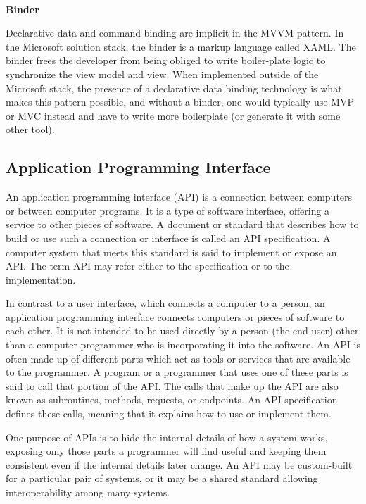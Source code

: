 \documentclass[12pt]{article}
\begin{document}
\\
\textbf{Binder}
\par
Declarative data and command-binding are implicit in the MVVM pattern. In the Microsoft solution stack, the binder is a markup language called XAML. The binder frees the developer from being obliged to write boiler-plate logic to synchronize the view model and view. When implemented outside of the Microsoft stack, the presence of a declarative data binding technology is what makes this pattern possible, and without a binder, one would typically use MVP or MVC instead and have to write more boilerplate (or generate it with some other tool).

\subsection{Application Programming Interface}


An application programming interface (API) is a connection between computers or between computer programs. It is a type of software interface, offering a service to other pieces of software. A document or standard that describes how to build or use such a connection or interface is called an API specification. A computer system that meets this standard is said to implement or expose an API. The term API may refer either to the specification or to the implementation.\par
In contrast to a user interface, which connects a computer to a person, an application programming interface connects computers or pieces of software to each other. It is not intended to be used directly by a person (the end user) other than a computer programmer who is incorporating it into the software. An API is often made up of different parts which act as tools or services that are available to the programmer. A program or a programmer that uses one of these parts is said to call that portion of the API. The calls that make up the API are also known as subroutines, methods, requests, or endpoints. An API specification defines these calls, meaning that it explains how to use or implement them.\par

One purpose of APIs is to hide the internal details of how a system works, exposing only those parts a programmer will find useful and keeping them consistent even if the internal details later change. An API may be custom-built for a particular pair of systems, or it may be a shared standard allowing interoperability among many systems.
\end{document}

